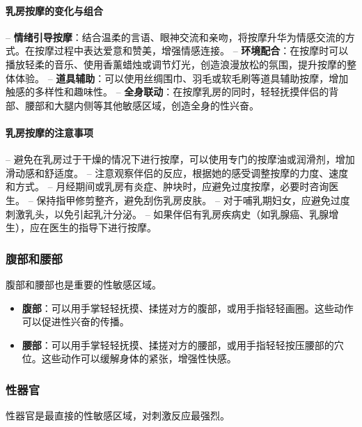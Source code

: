 \documentclass[12pt,UTF8]{ctexbook}
\begin{document}
\paragraph{乳房按摩的变化与组合}

-- \textbf{情绪引导按摩}：结合温柔的言语、眼神交流和亲吻，将按摩升华为情感交流的方式。在按摩过程中表达爱意和赞美，增强情感连接。
-- \textbf{环境配合}：在按摩时可以播放轻柔的音乐、使用香薰蜡烛或调节灯光，创造浪漫放松的氛围，提升按摩的整体体验。
-- \textbf{道具辅助}：可以使用丝绸围巾、羽毛或软毛刷等道具辅助按摩，增加触感的多样性和趣味性。
-- \textbf{全身联动}：在按摩乳房的同时，轻轻抚摸伴侣的背部、腰部和大腿内侧等其他敏感区域，创造全身的性兴奋。

\paragraph{乳房按摩的注意事项}

-- 避免在乳房过于干燥的情况下进行按摩，可以使用专门的按摩油或润滑剂，增加滑动感和舒适度。
-- 注意观察伴侣的反应，根据她的感受调整按摩的力度、速度和方式。
-- 月经期间或乳房有炎症、肿块时，应避免过度按摩，必要时咨询医生。
-- 保持指甲修剪整齐，避免刮伤乳房皮肤。
-- 对于哺乳期妇女，应避免过度刺激乳头，以免引起乳汁分泌。
-- 如果伴侣有乳房疾病史（如乳腺癌、乳腺增生），应在医生的指导下进行按摩。

\subsubsection{腹部和腰部}

腹部和腰部也是重要的性敏感区域。

\begin{itemize}
\item \textbf{腹部}：可以用手掌轻轻抚摸、揉搓对方的腹部，或用手指轻轻画圈。这些动作可以促进性兴奋的传播。
\item \textbf{腰部}：可以用手掌轻轻抚摸、揉搓对方的腰部，或用手指轻轻按压腰部的穴位。这些动作可以缓解身体的紧张，增强性快感。
\end{itemize}

\subsubsection{性器官}

性器官是最直接的性敏感区域，对刺激反应最强烈。
\end{document}
